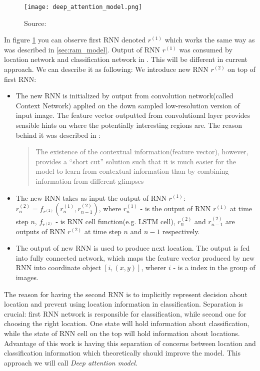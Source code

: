 {\begin{figure}
	\texttt{[image: deep\_attention\_model.png]}
	\caption{Source: \cite{DBLP:journals/corr/BaMK14}}
	\label{fig:deep_att_model}
\end{figure}

In figure \ref{fig:deep_att_model} you can observe first RNN denoted $r^{(1)}$ which works
the same way as was described in \autoref{sec:ram_model}. Output of RNN $r^{(1)}$
was consumed by location network and classification network in \cite{DBLP:journals/corr/MnihHGK14}.
This will be different in current approach. We can describe it as following:
We introduce new RNN $r^{(2)}$ on top of first RNN:
\begin{itemize}
	\item The new RNN is initialized by output from convolution
		network(called Context Network) applied on the down
		sampled low-resolution version of input image.
		The feature vector outputted from convolutional layer
		provides sensible hints on where
		the potentially interesting regions are.
		The reason behind it was described in \cite{DBLP:journals/corr/BaMK14}:
		\blockquote{The existence of the contextual information(feature vector),
		however, provides a
		“short cut” solution such that it is much easier for the model to
		learn from contextual information than by combining information
		from different glimpses}
	\item The new RNN takes as input the output of RNN $r^{(1)}$:
		$r_n^{(2)} = f_{r^{(2)}}(r_n^{(1)}, r_{n-1}^{(2)})$,
		where $r_n^{(1)}$ - is the output of RNN $r^{(1)}$ at time step $n$,
		$f_{r^{(2)}}$ - is RNN cell function(e.g. LSTM cell),
		  $r_n^{(2)}$ and $r_{n-1}^{(2)}$ are outputs of RNN $r^{(2)}$
		  at time step $n$ and $n-1$ respectively.
	\item The output of new RNN is used to produce next location.
		The output is fed into fully connected network, which maps
		the feature vector produced by new RNN into coordinate object $[i, (x,y)]$,
		wherer $i$ - is a index in the group of images.
\end{itemize}

The reason for having the second RNN is to implicitly
represent decision about location and
prevent using location information in classification. Separation is crucial:
first RNN network is responsible for
classification, while second one for choosing the right location.
One state will hold information about classification, while the state of
RNN cell on the top will hold information about locations.
Advantage of this work is having this separation of concerns between
location and classification information which theoretically should improve the model.
This approach we will call \emph{Deep attention model}.

}
